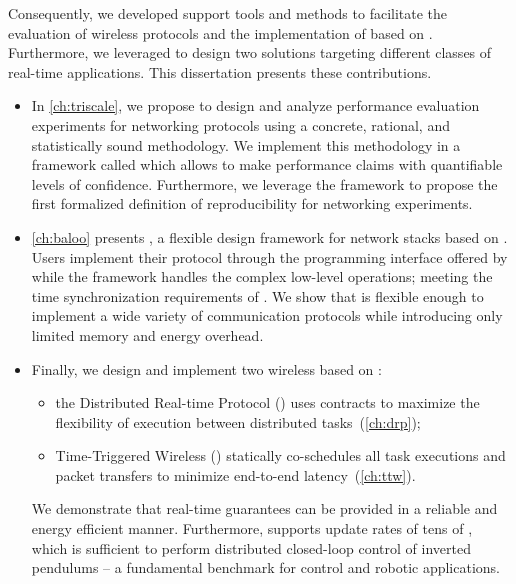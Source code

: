 Consequently, we developed support tools and methods to facilitate the evaluation of wireless protocols and the implementation of \CPS based on \ST.
\linebreak
Furthermore, we leveraged \ST to design two \CPS solutions targeting different classes of real-time applications.
This dissertation presents these contributions.

\begin{itemize}

  \item
  \startsquarepar
  In \cref{ch:triscale}, we propose to design and analyze performance evaluation experiments for networking protocols using a concrete, rational, and statistically sound methodology.
  We implement this methodology in a framework called \triscale  which allows to make performance claims with quantifiable levels of confidence.
  Furthermore, we leverage the \triscale framework to propose the first formalized definition of reproducibility for networking experiments.
  \stopsquarepar

  \item
  \startsquarepar
  \cref{ch:baloo} presents \baloo, a flexible design framework for network stacks based on \ST.
  Users implement their protocol through the programming interface offered by \baloo while the framework handles the complex low-level operations; \eg meeting the time synchronization requirements of \ST.
  \linebreak
  We show that \baloo is flexible enough to implement a wide variety of communication protocols while introducing only limited memory and energy overhead.
  \stopsquarepar

  \item
  Finally, we design and implement two wireless \CPS based on \ST:
  {\setlength{\parskip}{0pt}%
    \begin{itemize}[nosep]
      \item the Distributed Real-time Protocol (\DRP) uses contracts to maximize the flexibility of execution between distributed tasks~(\cref{ch:drp});
      \item Time-Triggered Wireless (\TTW) statically co-schedules all task executions and packet transfers to minimize end-to-end latency~(\cref{ch:ttw}).
    \end{itemize}
    \startsquarepar
    We demonstrate that real-time guarantees can be provided in a reliable and energy efficient manner.
    Furthermore, \TTW supports update rates of tens of \ms, which is sufficient to perform distributed closed-loop control of inverted pendulums -- a fundamental benchmark for control and robotic applications.
    \stopsquarepar
  }

\end{itemize}

